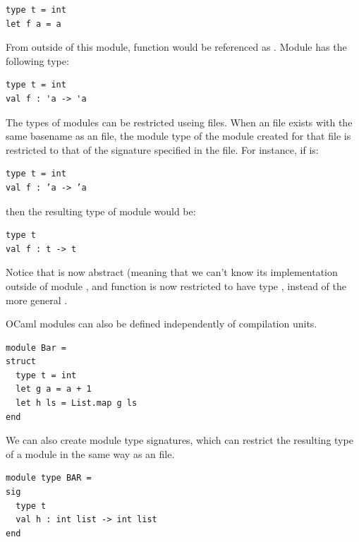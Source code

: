 \begin{lstlisting}
type t = int
let f a = a
\end{lstlisting}

From outside of this module, function  would be referenced as
. Module  has the following type:

\begin{lstlisting}
type t = int
val f : 'a -> 'a
\end{lstlisting}

The types of modules can be restricted useing  files. When
an  file exists with the same basename as an  file,
the module type of the module created for that  file is
restricted to that of the signature specified in the 
file. For instance, if  is:

%
\begin{lstlisting}
type t = int
val f : ’a -> ’a
\end{lstlisting}

then the resulting type of module  would be:

\begin{lstlisting}
type t
val f : t -> t
\end{lstlisting}

Notice that  is now abstract (meaning that we can't know
its implementation outside of module , and function 
is now restricted to have type , instead of the more
general .

OCaml modules can also be defined independently of compilation
units.

\begin{lstlisting}
module Bar =
struct
  type t = int
  let g a = a + 1
  let h ls = List.map g ls
end
\end{lstlisting}

We can also create module type signatures, which can restrict the
resulting type of a module in the same way as an  file.

\begin{lstlisting}
module type BAR =
sig
  type t
  val h : int list -> int list
end
\end{lstlisting}

